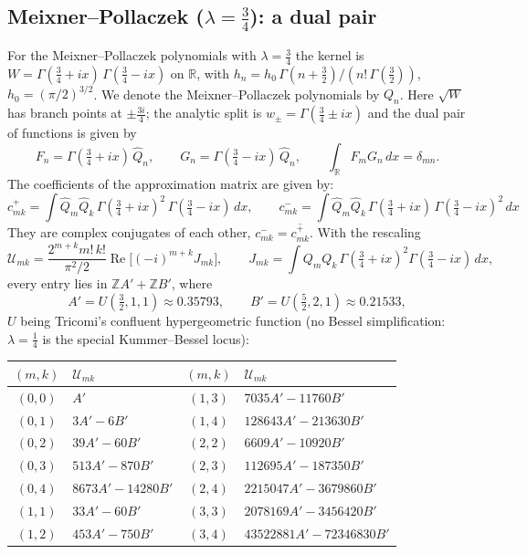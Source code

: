 \documentclass[11pt,a4paper]{article}
\theoremstyle{definition}
\newcommand{\R}{\mathbb{R}}
\newcommand{\Z}{\mathbb{Z}}
\newcommand{\G}{\Gamma}
\begin{document}
\subsection{Meixner--Pollaczek ($\lambda = \tfrac34$): a dual pair}

For the Meixner--Pollaczek polynomials with $\lambda = \tfrac34$ the
kernel is $W = \G(\tfrac34+ix)\,\G(\tfrac34-ix)$ on $\R$, with
$h_n = h_0\, \G(n+\tfrac32)/(n!\,\G(\tfrac32))$,
$h_0 = (\pi/2)^{3/2}$.
We denote the Meixner--Pollaczek polynomials by $Q_n$.
Here $\sqrt W$ has branch points at
$\pm\tfrac{3i}{4}$; the analytic split is $w_\pm = \G(\tfrac34 \pm ix)$
and the dual pair of functions is given by
\[
  F_n = \G(\tfrac34+ix)\,\widehat Q_n, \qquad
  G_n = \G(\tfrac34-ix)\,\widehat Q_n, \qquad
  \int_\R F_m G_n\, dx = \delta_{mn}.
\]
The coefficients of the approximation matrix are given by:
\[
  c^+_{mk} = \int \widehat Q_m \widehat Q_k\,
  \G(\tfrac34+ix)^2\,\G(\tfrac34-ix)\, dx, \qquad
  c^-_{mk} = \int \widehat Q_m \widehat Q_k\,
  \G(\tfrac34+ix)\,\G(\tfrac34-ix)^2\, dx
\]
They are complex conjugates of each other, $c^-_{mk} = \overline{c^+_{mk}}$.
With the rescaling
\[
  \mathcal U_{mk} = \frac{2^{m+k} m!\, k!}{\pi^2/2}
  \operatorname{Re}\bigl[(-i)^{m+k} J_{mk}\bigr],
  \qquad
  J_{mk} = \int Q_m Q_k\, \G(\tfrac34+ix)^2 \G(\tfrac34-ix)\, dx ,
\]
every entry lies in $\Z A' + \Z B'$, where
\[
  A' = U(\tfrac32, 1, 1) \approx 0.35793, \qquad
  B' = U(\tfrac52, 2, 1) \approx 0.21533,
\]
$U$ being Tricomi's confluent hypergeometric function
(no Bessel simplification: $\lambda = \tfrac14$ is the special
Kummer--Bessel locus):

\begin{tcolorbox}[colback=black!5, colframe=black!5, boxrule=0pt, sharp corners]
\begin{center}
\small
\begin{tabular}{cl@{\qquad}cl}
\toprule
$(m,k)$ & $\mathcal U_{mk}$ & $(m,k)$ & $\mathcal U_{mk}$ \\
\midrule
$(0,0)$ & $A'$                    & $(1,3)$ & $7035 A' - 11760 B'$ \\
$(0,1)$ & $3A' - 6B'$             & $(1,4)$ & $128643 A' - 213630 B'$ \\
$(0,2)$ & $39A' - 60B'$           & $(2,2)$ & $6609 A' - 10920 B'$ \\
$(0,3)$ & $513A' - 870B'$         & $(2,3)$ & $112695 A' - 187350 B'$ \\
$(0,4)$ & $8673A' - 14280B'$      & $(2,4)$ & $2215047 A' - 3679860 B'$ \\
$(1,1)$ & $33 A' - 60 B'$         & $(3,3)$ & $2078169 A' - 3456420 B'$ \\
$(1,2)$ & $453 A' - 750 B'$       & $(3,4)$ & $43522881 A' - 72346830 B'$ \\
\bottomrule
\end{tabular}
\end{center}
\end{tcolorbox}
\end{document}
